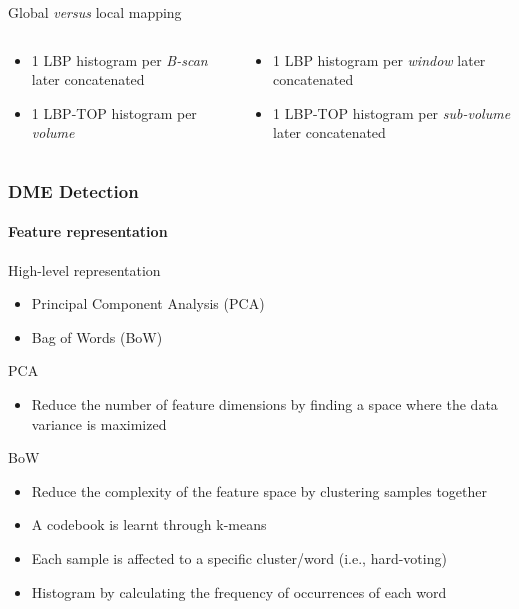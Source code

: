\documentclass{beamer}
\begin{document}
\begin{frame}
\begin{block}{Global \textit{versus} local mapping}
\begin{columns}
\begin{column}{.5\linewidth}
\begin{itemize}
        \item 1 LBP histogram per \emph{B-scan} later concatenated
        \item 1 LBP-TOP histogram per \emph{volume}
        \end{itemize}
       \end{column}
      \begin{column}{.5\linewidth}
        \begin{itemize}\footnotesize
        \item 1 LBP histogram per \emph{window} later concatenated
        \item 1 LBP-TOP histogram per \emph{sub-volume} later concatenated
        \end{itemize}
      \end{column}
    \end{columns}
  \end{block}
\end{frame}

\begin{frame}
  \frametitle{DME Detection}
  \framesubtitle{Feature representation}
  \begin{block}{High-level representation}\footnotesize
    \begin{itemize}
      \item Principal Component Analysis (PCA)
      \item Bag of Words (BoW)
    \end{itemize}
  \end{block}
  \begin{block}{PCA}
    \begin{itemize}\footnotesize
      \item Reduce the number of feature dimensions by finding a space where the data variance is maximized
    \end{itemize}
  \end{block}
  \begin{block}{BoW}
    \begin{itemize}\footnotesize
      \item Reduce the complexity of the feature space by clustering samples together
      \item A codebook is learnt through k-means
      \item Each sample is affected to a specific cluster/word (i.e., hard-voting)
      \item Histogram by calculating the frequency of occurrences of each word 
    \end{itemize}
  \end{block}
\end{frame}
\end{document}
